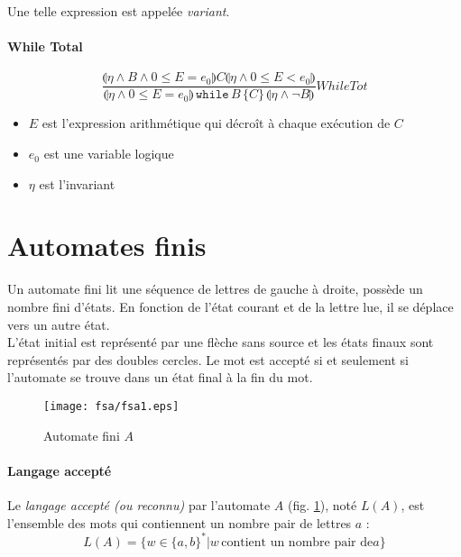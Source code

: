 \documentclass[a4paper]{article}
\begin{document}
  Une telle expression est appelée \textit{variant}.

  \paragraph{While Total}
  $$
    \frac{
      \llparenthesis\eta\land B \land 0 \leq E = e_0 \rrparenthesis
      C
      \llparenthesis\eta\land 0 \leq E < e_0 \rrparenthesis
    }
    {
      \llparenthesis\eta\land 0 \leq E = e_0 \rrparenthesis\,
      \texttt{while}\, B\, \{C\}\,
      \llparenthesis\eta\land\lnot B\rrparenthesis
    } WhileTot
  $$
  \begin{itemize}
    \item $E$ est l'expression arithmétique qui décroît à chaque exécution de $C$
    \item $e_0$ est une variable logique
    \item $\eta$ est l'invariant
  \end{itemize}


\section{Automates finis}
  Un automate fini lit une séquence de lettres de gauche à droite, possède un 
  nombre fini d'états. En fonction de l'état courant et de la lettre lue, il se
  déplace vers un autre état.\\

  L'état initial est représenté par une flèche sans source et les états finaux
  sont représentés par des doubles cercles. Le mot est accepté si et seulement si
  l'automate se trouve dans un état final à la fin du mot.

  \begin{figure}[H]
    \begin{center}
      \texttt{[image: fsa/fsa1.eps]}
      \caption{Automate fini $A$}
      \label{fig:fsa:1}
    \end{center}
  \end{figure}

  \paragraph{Langage accepté} Le \textit{langage accepté (ou reconnu)} par
  l'automate $A$ (fig. \ref{fig:fsa:1}), noté $L(A)$, est l'ensemble des mots
  qui contiennent un nombre pair de lettres $a$ :
  $$ L(A) = \{ w \in \{a,b\}^* | w\, \text{contient un nombre pair de} a \}$$
\end{document}

